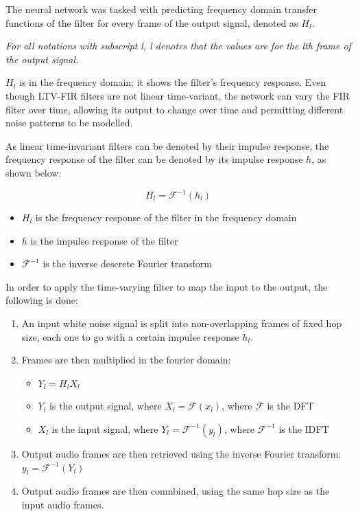 The neural network was tasked with predicting frequency domain transfer functions of the filter for every frame of the output signal, denoted as $H_l$\cite{OriginalDDSP}.

\textit{For all notations with subscript l, l denotes that the values are for the lth frame of the output signal.}

$H_l$ is in the frequency domain; it shows the filter's frequency response. Even though LTV-FIR filters are not linear time-variant, the network can vary the FIR filter over time, allowing its output to change over time and permitting different noise patterns to be modelled.

As linear time-invariant filters can be denoted by their impulse response, the frequency response of the filter can be denoted by its impulse response $h$, as shown below:

\begin{equation}
    H_l = \mathscr{F}^{-1}(h_l)
\end{equation}

\begin{itemize}
    \item $H_l$ is the frequency response of the filter in the frequency domain
    \item $h$ is the impulse response of the filter
    \item $\mathscr{F}^{-1}$ is the inverse descrete Fourier transform
\end{itemize}

In order to apply the time-varying filter to map the input to the output, the following is done:

\begin{enumerate}
    \item An input white noise signal is split into non-overlapping frames of fixed hop size, each one to go with a certain impulse response $h_l$.
    \item Frames are then multiplied in the fourier domain: \begin{itemize}
        \item $Y_l = H_l X_l$
        \item $Y_l$ is the output signal, where $X_l = \mathscr{F}(x_l)$, where $\mathscr{F}$ is the \acrfull{DFT}
        \item $X_l$ is the input signal, where $Y_l = \mathscr{F}^{-1}(y_l)$, where $\mathscr{F}^{-1}$ is the \acrfull{IDFT}
    \end{itemize}
    \item Output audio frames are then retrieved using the inverse Fourier transform:
        $y_l = \mathscr{F}^{-1}(Y_l)$
    \item Output audio frames are then comnbined, using the same hop size as the input audio frames.
\end{enumerate}

